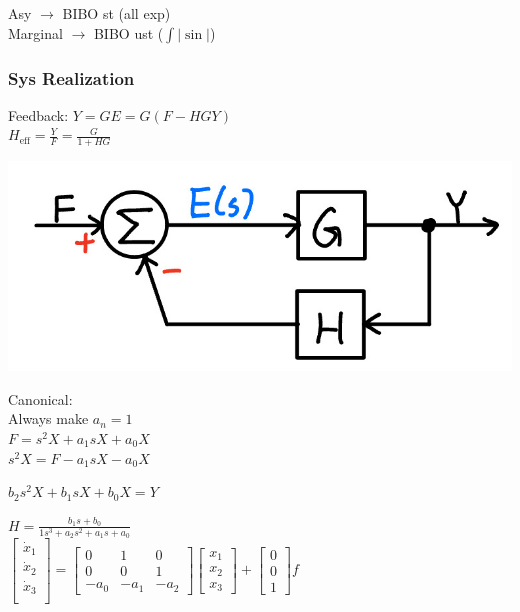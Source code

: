 \documentclass[4pt]{article}
\theoremstyle{definition}
\theoremstyle{definition}
\begin{document}
\begin{landscape}
\begin{multicols}{3}
    Asy $\rightarrow$ BIBO st (all exp)\\                                %
    Marginal $\rightarrow$ BIBO ust ($\int |\sin|$)                            %

\subsubsection*{Sys Realization}         %
    Feedback: \(Y = GE = G(F - HGY)\)\\
    \(H_{\text{eff}} = \frac{Y} F = \frac G {1+HG}\)

    \includegraphics[width=0.5\linewidth]{figures/feedback.jpg}


    Canonical:\\              %
    Always make $a_n = 1$\\
    \(F = s^2 X + a_1 sX + a_0 X\)\\
    \(s^2 X = F - a_1 sX - a_0 X\)      %

    \(b_2 s^2 X + b_1 sX + b_0 X = Y\)


    \(H = \frac{b_1s+b_0}{1s^3+a_2s^2+a_1s+a_0}\)\\     %

    \(
    \begin{bmatrix}
        \dot{x}_1\\
        \dot{x}_2\\
        \dot{x}_3\\
    \end{bmatrix}
    =
    \begin{bmatrix}
        0 & 1 & 0\\
        0 & 0 & 1\\
        -a_0 & -a_1 & -a_2      %
    \end{bmatrix}
    \begin{bmatrix}
        x_1\\
        x_2\\
        x_3
    \end{bmatrix}
    +
    \begin{bmatrix}
        0\\0\\1         %
    \end{bmatrix}
    f
    \)\\


\end{multicols}
\end{landscape}
\end{document}
